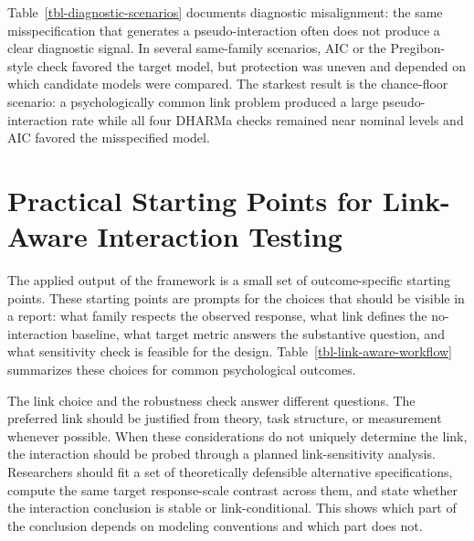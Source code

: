 \documentclass[
  man,
  longtable,
  nolmodern,
  notxfonts,
  notimes,
  colorlinks=true,linkcolor=blue,citecolor=blue,urlcolor=blue]{apa7}
\begin{document}
Table~\ref{tbl-diagnostic-scenarios} documents diagnostic misalignment:
the same misspecification that generates a pseudo-interaction often does
not produce a clear diagnostic signal. In several same-family scenarios,
AIC or the Pregibon-style check favored the target model, but protection
was uneven and depended on which candidate models were compared. The
starkest result is the chance-floor scenario: a psychologically common
link problem produced a large pseudo-interaction rate while all four
DHARMa checks remained near nominal levels and AIC favored the
misspecified model.

\section{Practical Starting Points for Link-Aware Interaction
Testing}\label{practical-starting-points-for-link-aware-interaction-testing}

The applied output of the framework is a small set of outcome-specific
starting points. These starting points are prompts for the choices that
should be visible in a report: what family respects the observed
response, what link defines the no-interaction baseline, what target
metric answers the substantive question, and what sensitivity check is
feasible for the design. Table~\ref{tbl-link-aware-workflow} summarizes
these choices for common psychological outcomes.

The link choice and the robustness check answer different questions. The
preferred link should be justified from theory, task structure, or
measurement whenever possible. When these considerations do not uniquely
determine the link, the interaction should be probed through a planned
link-sensitivity analysis. Researchers should fit a set of theoretically
defensible alternative specifications, compute the same target
response-scale contrast across them, and state whether the interaction
conclusion is stable or link-conditional. This shows which part of the
conclusion depends on modeling conventions and which part does not.
\end{document}
